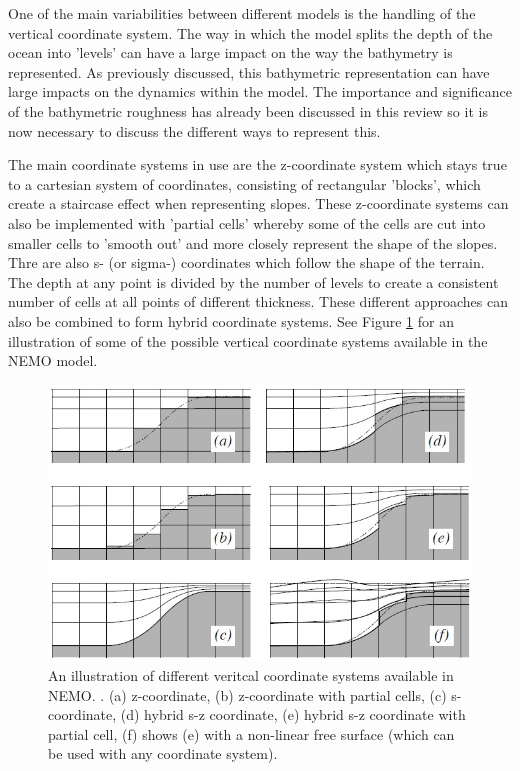 \documentclass[..\EOYR.tex]{subfiles}
\begin{document}
	One of the main variabilities between different models is the handling of the vertical coordinate system. The way in which the model splits the depth of the ocean into 'levels' can have a large impact on the way the bathymetry is represented. As previously discussed, this bathymetric representation can have large impacts on the dynamics within the model. The importance and significance of the bathymetric roughness has already been discussed in this review so it is now necessary to discuss the different ways to represent this.
    \par
The main coordinate systems in use are the z-coordinate system which stays true to a cartesian system of coordinates, consisting of rectangular 'blocks', which create a staircase effect when representing slopes. These z-coordinate systems can also be implemented with 'partial cells' whereby some of the cells are cut into smaller cells to 'smooth out' and more closely represent the shape of the slopes. Thre are also s- (or sigma-) coordinates which follow the shape of the terrain. The depth at any point is divided by the number of levels to create a consistent number of cells at all points of different thickness. These different approaches can also be combined to form hybrid coordinate systems. See Figure \ref{FIG:coords} for an illustration of some of the possible vertical coordinate systems available in the NEMO model.

\begin{figure}[t]
  \includegraphics[width=\linewidth]{Figures/NEMOP58.jpg}
  \caption{An illustration of different veritcal coordinate systems available in NEMO. \citep{Madec2011}. (a) z-coordinate, (b) z-coordinate with partial cells, (c) s-coordinate, (d) hybrid s-z coordinate, (e) hybrid s-z coordinate with partial cell, (f) shows (e) with a non-linear free surface (which can be used with any coordinate system).}
  \label{FIG:coords}
\end{figure}
\end{document}
